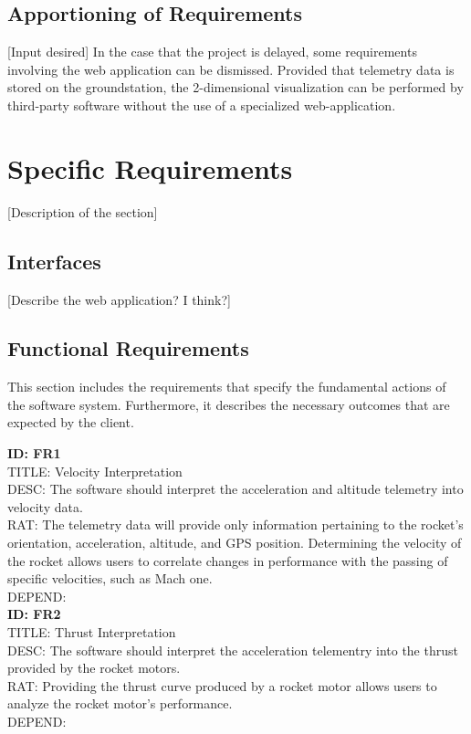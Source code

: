 \documentclass[onecolumn, draftclsnofoot,10pt, compsoc]{IEEEtran}
\begin{document}
		\subsection{Apportioning of Requirements}
			[Input desired]
			In the case that the project is delayed, some requirements involving the web application can be dismissed. Provided that telemetry data is stored on the groundstation, the 2-dimensional visualization can be performed by third-party software without the use of a specialized web-application.


	\newpage
	\section{Specific Requirements}
		[Description of the section]

		\subsection{Interfaces}
			[Describe the web application? I think?]

		\subsection{Functional Requirements}
			This section includes the requirements that specify the fundamental actions of the software system. Furthermore, it describes the necessary outcomes that are expected by the client.

			\noindent
			\textbf{ID: FR1}\\
			TITLE: Velocity Interpretation\\
			DESC: The software should interpret the acceleration and altitude telemetry into velocity data.\\
			RAT: The telemetry data will provide only information pertaining to the rocket's orientation, acceleration, altitude, and GPS position.
				Determining the velocity of the rocket allows users to correlate changes in performance with the passing of specific velocities, such as Mach one.\\
			DEPEND: \\
			
			\noindent
			\textbf{ID: FR2}\\
			TITLE: Thrust Interpretation\\
			DESC: The software should interpret the acceleration telementry into the thrust provided by the rocket motors.\\
			RAT: Providing the thrust curve produced by a rocket motor allows users to analyze the rocket motor's performance.\\
			DEPEND: \\
			
\end{document}
